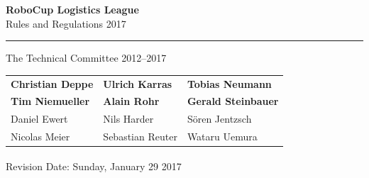 \documentclass[12pt,twoside]{article}
\begin{document}
\hypersetup{pageanchor=false}


\begin{titlepage}
  \vspace*{5cm}
  \begin{center}
    \begin{LARGE}
      
      {\bf RoboCup Logistics League}\\[2ex]
      {\Large Rules and Regulations 2017}\\[4ex]
    \end{LARGE}
    \hrule
    
    {\LARGE\vspace*{4ex}}
    \begin{Large}
      The Technical Committee 2012--2017\\[6ex]
    \end{Large}
    \begin{tabular}{lll}
      \textbf{Christian Deppe}&\textbf{Ulrich Karras}&\textbf{Tobias Neumann}\\
      \textbf{Tim Niemueller}&\textbf{Alain Rohr}&\textbf{Gerald Steinbauer}\\[.5em]
      
      Daniel Ewert&Nils Harder&S\"oren Jentzsch\\
      Nicolas Meier&Sebastian Reuter&Wataru Uemura\\
    \end{tabular}
    \vfill
    Revision Date: Sunday, January 29\textsuperscript{} 2017 %
  \end{center}
\end{titlepage}
\thispagestyle{empty}
\pagebreak
\clearpage

\hypersetup{pageanchor=true}
\setcounter{page}{1}
\tableofcontents
\newpage
\cleardoublepage

\setcounter{page}{1}

\end{document}
